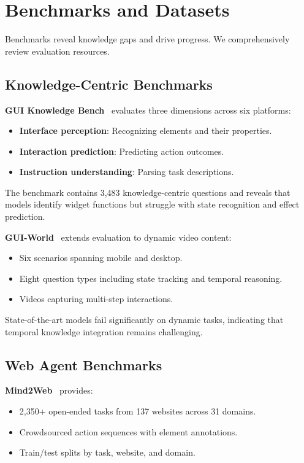 \documentclass[11pt]{article}
\begin{document}
\section{Benchmarks and Datasets}
\label{sec:benchmarks}

Benchmarks reveal knowledge gaps and drive progress. We comprehensively review evaluation resources.

\subsection{Knowledge-Centric Benchmarks}

\textbf{GUI Knowledge Bench}~\cite{guiknowledgebench2024} evaluates three dimensions across six platforms:

\begin{itemize}
    \item \textbf{Interface perception}: Recognizing elements and their properties.
    \item \textbf{Interaction prediction}: Predicting action outcomes.
    \item \textbf{Instruction understanding}: Parsing task descriptions.
\end{itemize}

The benchmark contains 3,483 knowledge-centric questions and reveals that models identify widget functions but struggle with state recognition and effect prediction.

\textbf{GUI-World}~\cite{guiworld2024} extends evaluation to dynamic video content:

\begin{itemize}
    \item Six scenarios spanning mobile and desktop.
    \item Eight question types including state tracking and temporal reasoning.
    \item Videos capturing multi-step interactions.
\end{itemize}

State-of-the-art models fail significantly on dynamic tasks, indicating that temporal knowledge integration remains challenging.

\subsection{Web Agent Benchmarks}

\textbf{Mind2Web}~\cite{mind2web2023} provides:

\begin{itemize}
    \item 2,350+ open-ended tasks from 137 websites across 31 domains.
    \item Crowdsourced action sequences with element annotations.
    \item Train/test splits by task, website, and domain.
\end{itemize}
\end{document}

